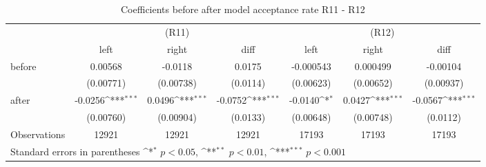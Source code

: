 \begin{table}[!ht]\centering \footnotesize
\def\sym#1{\ifmmode^{#1}\else\(^{#1}\)\fi}
\caption{Coefficients before after model acceptance rate R11 - R12}
\begin{tabular}{l*{6}{c}}
\hline\hline
                    &\multicolumn{3}{c}{(R11)}&\multicolumn{3}{c}{(R12)}\\
                    &\multicolumn{1}{c}{left}&\multicolumn{1}{c}{right}&\multicolumn{1}{c}{diff}&\multicolumn{1}{c}{left}&\multicolumn{1}{c}{right}&\multicolumn{1}{c}{diff}\\
\hline
before              &     0.00568         &     -0.0118         &      0.0175         &   -0.000543         &    0.000499         &    -0.00104         \\
                    &   (0.00771)         &   (0.00738)         &    (0.0114)         &   (0.00623)         &   (0.00652)         &   (0.00937)         \\
[0.5em]
after               &     -0.0256\sym{***}&      0.0496\sym{***}&     -0.0752\sym{***}&     -0.0140\sym{*}  &      0.0427\sym{***}&     -0.0567\sym{***}\\
                    &   (0.00760)         &   (0.00904)         &    (0.0133)         &   (0.00648)         &   (0.00748)         &    (0.0112)         \\
\hline
Observations        &       12921         &       12921         &       12921         &       17193         &       17193         &       17193         \\
\hline\hline
\multicolumn{7}{l}{\footnotesize Standard errors in parentheses \sym{*} \(p<0.05\), \sym{**} \(p<0.01\), \sym{***} \(p<0.001\)}\\
\end{tabular}
\end{table}
